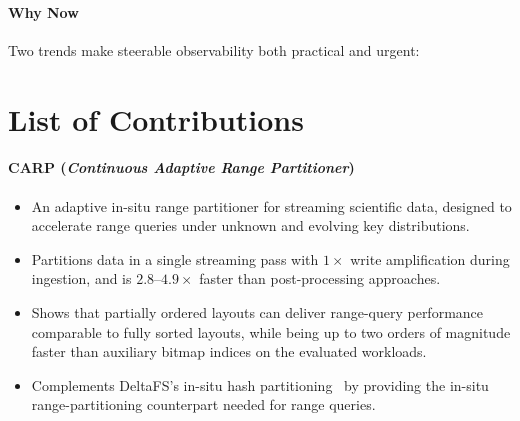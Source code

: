 \paragraph{Why Now} Two trends make steerable observability both practical and urgent:



\enlargethispage{-\baselineskip}
\section{List of Contributions}
\label{sec:intro:contribs}


\paragraph{CARP (\emph{Continuous Adaptive Range Partitioner})}
\begin{itemize}
  \item An adaptive in-situ range partitioner for streaming scientific data, designed to accelerate
        range queries under unknown and evolving key distributions.

  \item Partitions data in a single streaming pass with $1\times$ write amplification during
        ingestion,
        and is $2.8$--$4.9\times$ faster than post-processing approaches.

  \item Shows that partially ordered layouts can deliver range-query performance comparable to fully
        sorted layouts, while being up to two orders of magnitude faster than auxiliary bitmap indices
        on the evaluated workloads.

  \item Complements DeltaFS's in-situ hash partitioning~\cite{Zheng2018:DeltaFS} by providing the
        in-situ range-partitioning
        counterpart needed for range queries.
\end{itemize}

